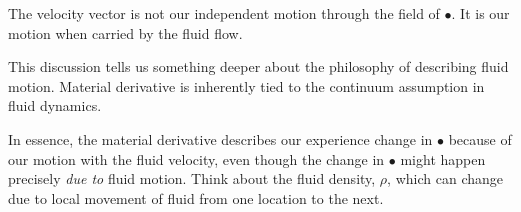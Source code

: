 The velocity vector is not our independent motion through the field of $\bullet$. It is our motion when carried by the fluid flow.


This discussion tells us something deeper about the philosophy of describing fluid motion. Material derivative is inherently tied to the continuum assumption in fluid dynamics.

In essence, the material derivative describes our experience change in $\bullet$ because of our motion with the fluid velocity, even though the change in $\bullet$ might happen precisely \textit{due to} fluid motion. Think about the fluid density, $\rho$, which can change due to local movement of fluid from one location to the next.



